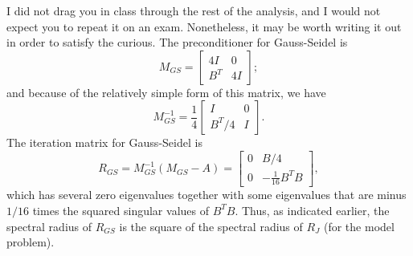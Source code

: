 \documentclass[12pt, leqno]{article} %
\begin{document}
I did not drag you in class through the rest of the analysis, and I
would not expect you to repeat it on an exam.  Nonetheless, it may be
worth writing it out in order to satisfy the curious.
The preconditioner for Gauss-Seidel is
\[
  M_{GS} = \begin{bmatrix} 4I & 0 \\ B^T & 4I \end{bmatrix};
\]
and because of the relatively simple form of this matrix, we have
\[
  M_{GS}^{-1} =
  \frac{1}{4}
  \begin{bmatrix}
    I & 0 \\
    B^T/4 & I
  \end{bmatrix}.
\]
The iteration matrix for Gauss-Seidel is
\[
  R_{GS} = M_{GS}^{-1} (M_{GS}-A) =
  \begin{bmatrix} 0 & B/4 \\ 0 & -\frac{1}{16} B^T B \end{bmatrix},
\]
which has several zero eigenvalues together with some eigenvalues that
are minus $1/16$ times the squared singular values of $B^T B$.  Thus,
as indicated earlier, the spectral radius of $R_{GS}$ is the square of
the spectral radius of $R_{J}$ (for the model problem).
\end{document}

